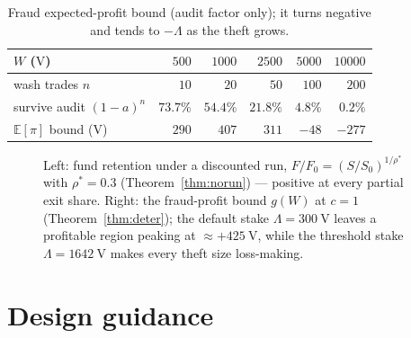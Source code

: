 \documentclass[11pt]{article}
\theoremstyle{plain}
\theoremstyle{definition}
\theoremstyle{remark}
\newcommand{\V}{\mathrm{V}}
\begin{document}
\begin{table}[h]
\centering
\begin{tabular}{lrrrrr}
\toprule
$W$ ($\V$) & $500$ & $1000$ & $2500$ & $5000$ & $10000$\\
\midrule
wash trades $n$ & $10$ & $20$ & $50$ & $100$ & $200$\\
survive audit $(1-a)^n$ & $73.7\%$ & $54.4\%$ & $21.8\%$ & $4.8\%$ & $0.2\%$\\
$\mathbb{E}[\pi]$ bound ($\V$) & $290$ & $407$ & $311$ & $-48$ & $-277$\\
\bottomrule
\end{tabular}
\caption{Fraud expected-profit bound (audit factor only); it turns negative and tends to $-\Lambda$ as the theft grows.}
\label{tab:fraud}
\end{table}

\begin{figure}[t]
\centering
{}\hfill
{}
\caption{Left: fund retention under a discounted run, $F/F_0=(S/S_0)^{1/\rho^*}$ with $\rho^*=0.3$ (Theorem~\ref{thm:norun}) --- positive at every partial exit share. Right: the fraud-profit bound $g(W)$ at $c=1$ (Theorem~\ref{thm:deter}); the default stake $\Lambda=300~\V$ leaves a profitable region peaking at ${\approx}{+}425~\V$, while the threshold stake $\Lambda=1642~\V$ makes every theft size loss-making.}
\label{fig:analytic}
\end{figure}

\section{Design guidance}\label{sec:guidance}
\end{document}

